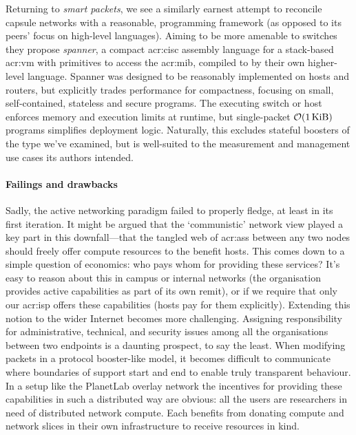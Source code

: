 Returning to \emph{smart packets}, we see a similarly earnest attempt to reconcile capsule networks with a reasonable, programming framework (as opposed to its peers' focus on high-level languages).
Aiming to be more amenable to switches they propose \emph{spanner}, a compact \gls{acr:cisc} assembly language for a stack-based \gls{acr:vm} with primitives to access the \gls{acr:mib}, compiled to by their own higher-level language.
Spanner was designed to be reasonably implemented on hosts and routers, but explicitly trades performance for compactness, focusing on small, self-contained, stateless and secure programs.
The executing switch or host enforces memory and execution limits at runtime, but single-packet $\mathcal{O}(\text{\qty{1}{\kibi\byte}})$ programs simplifies deployment logic.
Naturally, this excludes stateful boosters of the type we've examined, but is well-suited to the measurement and management use cases its authors intended.


\paragraph{Failings and drawbacks}
Sadly, the active networking paradigm failed to properly fledge, at least in its first iteration.
It might be argued that the `communistic' network view played a key part in this downfall---that the tangled web of \glspl{acr:as} between any two nodes should freely offer compute resources to the benefit hosts.
This comes down to a simple question of economics: who pays whom for providing these services?
It's easy to reason about this in campus or internal networks (the organisation provides active capabilities as part of its own remit), or if we require that only our \gls{acr:isp} offers these capabilities (hosts pay for them explicitly).
Extending this notion to the wider Internet becomes more challenging.
Assigning responsibility for administrative, technical, and security issues among all the organisations between two endpoints is a daunting prospect, to say the least.
When modifying packets in a protocol booster-like model, it becomes difficult to communicate where boundaries of support start and end to enable truly transparent behaviour.
In a setup like the PlanetLab overlay network the incentives for providing these capabilities in such a distributed way are obvious: all the users are researchers in need of distributed network compute.
Each benefits from donating compute and network slices in their own infrastructure to receive resources in kind.

